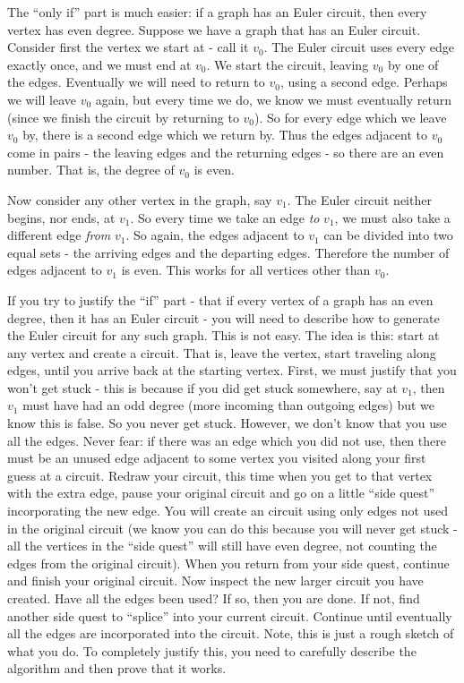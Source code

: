 \documentclass[11pt]{exam}
\begin{document}
\begin{questions}
\begin{solution}
 The ``only if'' part is much easier: if a graph has an Euler circuit, then every vertex has even degree.  Suppose we have a graph that has an Euler circuit.  Consider first the vertex we start at - call it $v_0$.  The Euler circuit uses every edge exactly once, and we must end at $v_0$.  We start the circuit, leaving $v_0$ by one of the edges.  Eventually we will need to return to $v_0$, using a second edge.  Perhaps we will leave $v_0$ again, but every time we do, we know we must eventually return (since we finish the circuit by returning to $v_0$).  So for every edge which we leave $v_0$ by, there is a second edge which we return by.  Thus the edges adjacent to $v_0$ come in pairs - the leaving edges and the returning edges - so there are an even number.  That is, the degree of $v_0$ is even.
 
 Now consider any other vertex in the graph, say $v_1$.  The Euler circuit neither begins, nor ends, at $v_1$.  So every time we take an edge {\em to} $v_1$, we must also take a different edge {\em from} $v_1$.  So again, the edges adjacent to $v_1$ can be divided into two equal sets - the arriving edges and the departing edges.  Therefore the number of edges adjacent to $v_1$ is even.  This works for all vertices other than $v_0$.  
 
 If you try to justify the ``if'' part - that if every vertex of a graph has an even degree, then it has an Euler circuit - you will need to describe how to generate the Euler circuit for any such graph.  This is not easy.  The idea is this: start at any vertex and create a circuit.  That is, leave the vertex, start traveling along edges, until you arrive back at the starting vertex.  First, we must justify that you won't get stuck - this is because if you did get stuck somewhere, say at $v_1$, then $v_1$ must have had an odd degree (more incoming than outgoing edges) but we know this is false.  So you never get stuck.  However, we don't know that you use all the edges.  Never fear: if there was an edge which you did not use, then there must be an unused edge adjacent to some vertex you visited along your first guess at a circuit.  Redraw your circuit, this time when you get to that vertex with the extra edge, pause your original circuit and go on a little ``side quest'' incorporating the new edge.  You will 
create an circuit using only edges not used in the original circuit (we know you can do this because you will never get stuck - all the vertices in the ``side quest'' will still have even degree, not counting the edges from the original circuit).  When you return from your side quest, continue and finish your original circuit.  Now inspect the new larger circuit you have created.  Have all the edges been used?  If so, then you are done.  If not, find another side quest to ``splice'' into your current circuit.  Continue until eventually all the edges are incorporated into the circuit.  Note, this is just a rough sketch of what you do.  To completely justify this, you need to carefully describe the algorithm and then prove that it works. 
\end{solution}

\end{questions}
\end{document}
